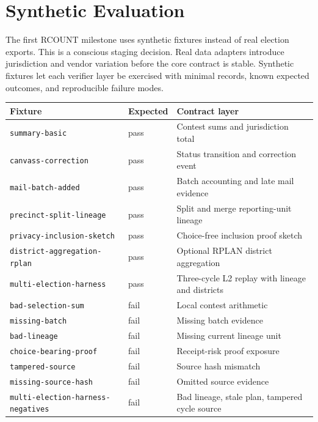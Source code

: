 \section{Synthetic Evaluation}

The first RCOUNT milestone uses synthetic fixtures instead of real election
exports. This is a conscious staging decision. Real data adapters introduce
jurisdiction and vendor variation before the core contract is stable. Synthetic
fixtures let each verifier layer be exercised with minimal records, known
expected outcomes, and reproducible failure modes.

\begin{center}
\small
\begin{tabularx}{\textwidth}{llX}
\toprule
Fixture & Expected & Contract layer \\
\midrule
\texttt{summary-basic} & pass & Contest sums and jurisdiction total \\
\texttt{canvass-correction} & pass & Status transition and correction event \\
\texttt{mail-batch-added} & pass & Batch accounting and late mail evidence \\
\texttt{precinct-split-lineage} & pass & Split and merge reporting-unit lineage \\
\texttt{privacy-inclusion-sketch} & pass & Choice-free inclusion proof sketch \\
\texttt{district-aggregation-rplan} & pass & Optional RPLAN district aggregation \\
\texttt{multi-election-harness} & pass & Three-cycle L2 replay with lineage and districts \\
\texttt{bad-selection-sum} & fail & Local contest arithmetic \\
\texttt{missing-batch} & fail & Missing batch evidence \\
\texttt{bad-lineage} & fail & Missing current lineage unit \\
\texttt{choice-bearing-proof} & fail & Receipt-risk proof exposure \\
\texttt{tampered-source} & fail & Source hash mismatch \\
\texttt{missing-source-hash} & fail & Omitted source evidence \\
\texttt{multi-election-harness-negatives} & fail & Bad lineage, stale plan, tampered cycle source \\
\bottomrule
\end{tabularx}
\end{center}


